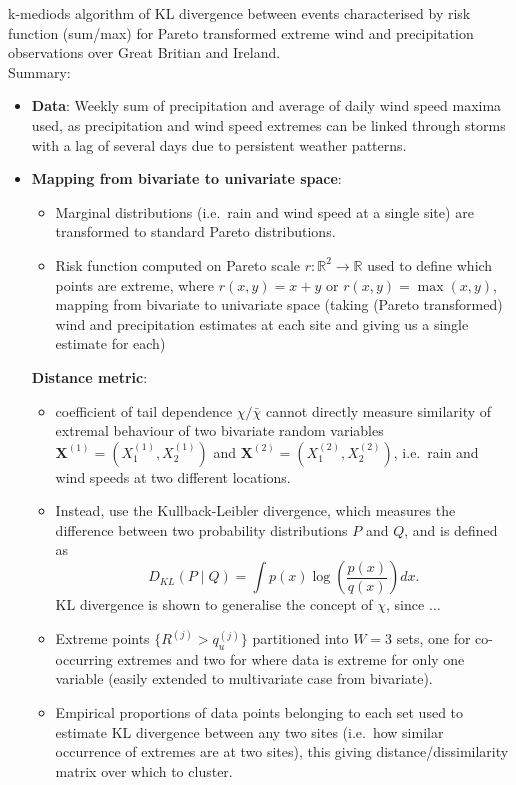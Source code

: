 \documentclass{article}
\numberwithin{equation}{section}
\begin{document}
\cite{Vignotto2021} k-mediods algorithm of KL divergence between events characterised by risk function (sum/max) for Pareto transformed extreme wind and precipitation observations over Great Britian and Ireland. \\ 
Summary:
\begin{itemize}
  \item \textbf{Data}: Weekly sum of precipitation and average of daily wind speed maxima used, as precipitation and wind speed extremes can be linked through storms with a lag of several days due to persistent weather patterns. 
  \item \textbf{Mapping from bivariate to univariate space}: 
  \begin{itemize}
    \item Marginal distributions (i.e.\ rain and wind speed at a single site) are transformed to standard Pareto distributions. 
    \item Risk function computed on Pareto scale $r:\mathbb{R}^2 \rightarrow \mathbb{R}$ used to define which points are extreme, where $r(x, y) = x + y$ or $r(x, y) = \max(x, y)$, mapping from bivariate to univariate space (taking (Pareto transformed) wind and precipitation estimates at each site and giving us a single estimate for each)   \end{itemize}
  \textbf{Distance metric}:
  \begin{itemize}
    \item coefficient of tail dependence $\chi/\bar{\chi}$ cannot directly measure similarity of extremal behaviour of two bivariate random variables $\bm{X}^{(1)} = (X_1^{(1)}, X_2^{(1)})$ and $\bm{X}^{(2)} = (X_1^{(2)}, X_2^{(2)})$, i.e.\ rain and wind speeds at two different locations.
    \item Instead, use the Kullback-Leibler divergence, which measures the difference between two probability distributions $P$ and $Q$, and is defined as 
    \[
      D_{KL}(P \mid Q) = \int{p(x) \log\left(\frac{p(x)}{q(x)}\right)dx}.
    \]
    KL divergence is shown to generalise the concept of $\chi$, since $\ldots$ 
  \item Extreme points $\{R^{(j)} > q_u^{(j)}\}$ partitioned into $W = 3$ sets, one for co-occurring extremes and two for where data is extreme for only one variable (easily extended to multivariate case from bivariate).
  \item Empirical proportions of data points belonging to each set used to estimate KL divergence between any two sites (i.e.\ how similar occurrence of extremes are at two sites), this giving distance/dissimilarity matrix over which to cluster.

\end{itemize}
\end{itemize}
\end{document}

